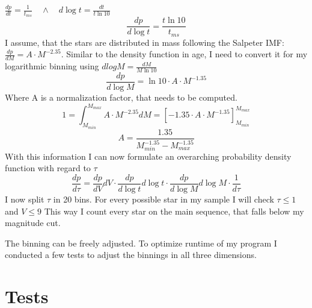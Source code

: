 \documentclass[a4paper,10pt]{article}
\begin{document}
  $\frac{dp}{dt}=\frac{1}{t_{ms}}\quad \land \quad d\log t=\frac{dt}{t \ln 10}$
 \begin{equation}
  \frac{dp}{d\log t}=\frac{t\ln 10}{t_{ms}}
 \end{equation}
 I assume, that the stars are distributed in mass following the Salpeter IMF:
 $\frac{dp}{dM}=A\cdot M^{-2.35}$\citep{1955ApJ...121..161S}. Similar
 to the density function in age, I need to convert it for my logarithmic binning using $dlogM = \frac{dM}{M\ln 10}$
 \begin{equation}
  \frac{dp}{d\log M}=\ln 10 \cdot A\cdot M^{-1.35}
 \end{equation}
 Where A is a normalization factor, that needs to be computed. 
 \begin{equation}
  1=\int_{M_{min}}^{M_{max}}A\cdot M^{-2.35} dM =\left[ -1.35\cdot A\cdot M^{-1.35}\right]_{M_{min}}^{M_{max}}
 \end{equation}
 \begin{equation}
  A= \frac{1.35}{M_{min}^{-1.35}-M_{max}^{-1.35}}
 \end{equation}
 With this information I can now formulate an overarching probability density function with regard to $\tau$
 \begin{equation}
  \frac{dp}{d\tau}=\frac{dp}{dV}dV \cdot \frac{dp}{d\log t}d\log t \cdot \frac{dp}{d\log M}d\log M\cdot \frac{1}{d\tau}
 \end{equation}
 I now split $\tau$ in 20 bins. For every possible star in my sample I will check $\tau\le 1$ and $V\le 9$ This way I count every
 star on the main sequence, that falls below my magnitude cut. 

 
 The binning can be freely adjusted. To optimize runtime of my program I conducted a few tests to adjust the binnings in all three dimensions.\\
 
 \newpage
 \section{Tests}
 
\end{document}
